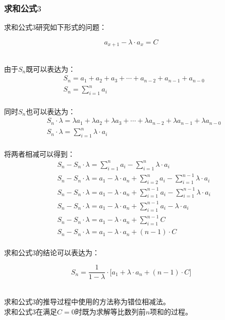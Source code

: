 \documentclass[UTF8]{ctexart}
\begin{document}
\newpage

\subsubsection{求和公式$3$}
    \setcounter{equation}{0}
    求和公式$3$研究如下形式的问题：
    \begin{large}
        \begin{equation*}
            a_{x+1}-\lambda\cdot a_x=C
        \end{equation*}
    \end{large}\\
    由于$S_n$既可以表达为：
    \begin{align}
        &S_n=a_1+a_2+a_3+\cdots+a_{n-2}+a_{n-1}+a_{n-0}\\[3mm]
        &S_n=\sum_{i=1}^{n}a_{i}
    \end{align}\\
    同时$S_n$也可以表达为：
    \begin{align}
        &S_n\cdot\lambda=\lambda a_1+\lambda a_2+\lambda a_3+\cdots+\lambda a_{n-2}+\lambda a_{n-1}+\lambda a_{n-0}\\[3mm]
        &S_n\cdot\lambda=\sum_{i=1}^n\lambda\cdot a_{i}
    \end{align}\\
    将两者相减可以得到：
    \begin{align}
        &S_n-S_n\cdot\lambda=\sum_{i=1}^na_i-\sum_{i=1}^n\lambda\cdot a_i\\[3mm]
        &S_n-S_n\cdot\lambda=a_1-\lambda\cdot a_n+\sum_{i=2}^{n}a_i-\sum_{i=1}^{n-1}\lambda\cdot a_i\\[3mm]
        &S_n-S_n\cdot\lambda=a_1-\lambda\cdot a_n+\sum_{i=1}^{n-1}a_i-\sum_{i=1}^{n-1}\lambda\cdot a_i\\[3mm]
        &S_n-S_n\cdot\lambda=a_1-\lambda\cdot a_n+\sum_{i=1}^{n-1}a_i-\lambda\cdot a_i\\[3mm]
        &S_n-S_n\cdot\lambda=a_1-\lambda\cdot a_n+\sum_{i=1}^{n-1}C\\[3mm]
        &S_n-S_n\cdot\lambda=a_1-\lambda\cdot a_n+(n-1)\cdot C
    \end{align}\\
    求和公式$3$的结论可以表达为：
    \begin{large}
        \begin{equation*}
            S_n=\frac{1}{1-\lambda}\cdot\big[a_1+\lambda\cdot a_n+(n-1)\cdot C\big]
        \end{equation*}
    \end{large}\\
    求和公式$3$的推导过程中使用的方法称为错位相减法。\\[3mm]
    求和公式$3$在满足$C=0$时既为求解等比数列前$n$项和的过程。
\end{document}

